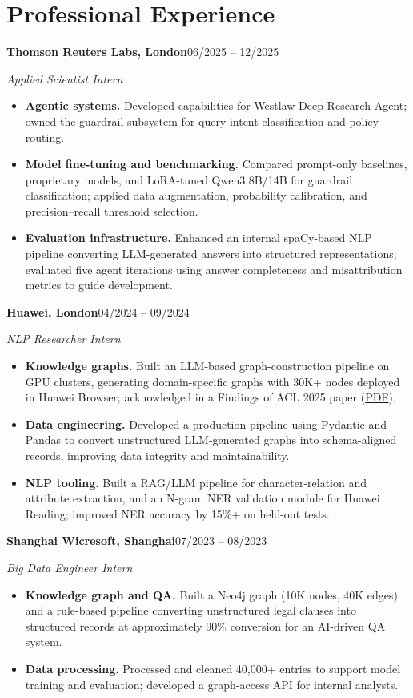 \documentclass[a4paper,10pt]{article}
\begin{document}
\newpage
\section*{Professional Experience}
\textbf{Thomson Reuters Labs, London}\hfill 06/2025 -- 12/2025\par
\textit{Applied Scientist Intern}
\begin{itemize}
\item \textbf{Agentic systems.} Developed capabilities for Westlaw Deep Research Agent; owned the guardrail subsystem for query-intent classification and policy routing.
\item \textbf{Model fine-tuning and benchmarking.} Compared prompt-only baselines, proprietary models, and LoRA-tuned Qwen3 8B/14B for guardrail classification; applied data augmentation, probability calibration, and precision--recall threshold selection.
\item \textbf{Evaluation infrastructure.} Enhanced an internal spaCy-based NLP pipeline converting LLM-generated answers into structured representations; evaluated five agent iterations using answer completeness and misattribution metrics to guide development.
\end{itemize}

\vspace{0.4em}
\textbf{Huawei, London}\hfill 04/2024 -- 09/2024\par
\textit{NLP Researcher Intern}
\begin{itemize}
\item \textbf{Knowledge graphs.} Built an LLM-based graph-construction pipeline on GPU clusters, generating domain-specific graphs with 30K+ nodes deployed in Huawei Browser; acknowledged in a Findings of ACL 2025 paper (\href{https://aclanthology.org/2025.findings-acl.602.pdf}{PDF}).
\item \textbf{Data engineering.} Developed a production pipeline using Pydantic and Pandas to convert unstructured LLM-generated graphs into schema-aligned records, improving data integrity and maintainability.
\item \textbf{NLP tooling.} Built a RAG/LLM pipeline for character-relation and attribute extraction, and an N-gram NER validation module for Huawei Reading; improved NER accuracy by 15\%+ on held-out tests.
\end{itemize}

\vspace{0.4em}
\textbf{Shanghai Wicresoft, Shanghai}\hfill 07/2023 -- 08/2023\par
\textit{Big Data Engineer Intern}
\begin{itemize}
\item \textbf{Knowledge graph and QA.} Built a Neo4j graph (10K nodes, 40K edges) and a rule-based pipeline converting unstructured legal clauses into structured records at approximately 90\% conversion for an AI-driven QA system.
\item \textbf{Data processing.} Processed and cleaned 40,000+ entries to support model training and evaluation; developed a graph-access API for internal analysts.
\end{itemize}
\end{document}
